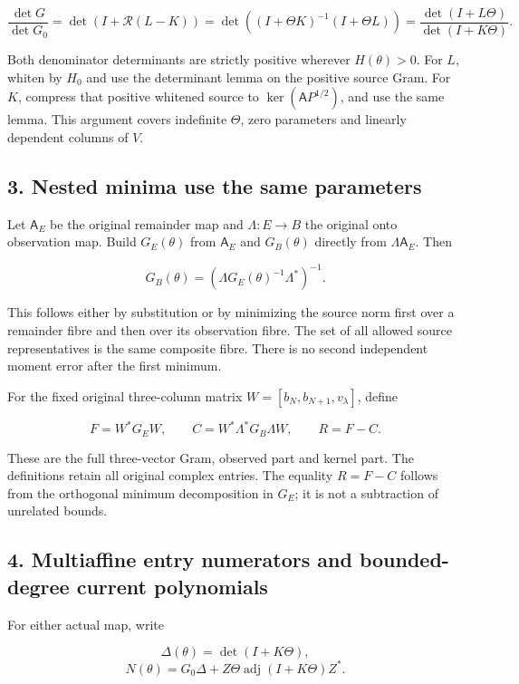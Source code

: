 \[
 \frac{\det G}{\det G_0}
 =\det\!\left(I+\mathcal R(L-K)\right)
 =\det\!\left((I+\Theta K)^{-1}(I+\Theta L)\right)
 =\frac{\det(I+L\Theta)}{\det(I+K\Theta)}.
\]

Both denominator determinants are strictly positive wherever
\(H(\theta)>0\). For \(L\), whiten by \(H_0\) and use the determinant
lemma on the positive source Gram. For \(K\), compress that positive
whitened source to \(\ker(\mathsf A P^{1/2})\), and use the same lemma.
This argument covers indefinite \(\Theta\), zero parameters and linearly
dependent columns of \(V\).

\subsection{3. Nested minima use the same
parameters}\label{nested-minima-use-the-same-parameters}

Let \(\mathsf A_E\) be the original remainder map and \(\Lambda:E\to B\)
the original onto observation map. Build \(G_E(\theta)\) from
\(\mathsf A_E\) and \(G_B(\theta)\) directly from
\(\Lambda\mathsf A_E\). Then

\[
 G_B(\theta)=(\Lambda G_E(\theta)^{-1}\Lambda^*)^{-1}.
\]

This follows either by substitution or by minimizing the source norm
first over a remainder fibre and then over its observation fibre. The
set of all allowed source representatives is the same composite fibre.
There is no second independent moment error after the first minimum.

For the fixed original three-column matrix
\(W=[b_N,b_{N+1},v_\lambda]\), define

\[
 F=W^*G_EW,\qquad
 C=W^*\Lambda^*G_B\Lambda W,\qquad R=F-C.
\]

These are the full three-vector Gram, observed part and kernel part. The
definitions retain all original complex entries. The equality \(R=F-C\)
follows from the orthogonal minimum decomposition in \(G_E\); it is not
a subtraction of unrelated bounds.

\subsection{4. Multiaffine entry numerators and bounded-degree current
polynomials}\label{multiaffine-entry-numerators-and-bounded-degree-current-polynomials}

For either actual map, write

\[
 \Delta(\theta)=\det(I+K\Theta),
\] \[
 N(\theta)=G_0\Delta+Z\Theta\operatorname{adj}(I+K\Theta)Z^*.
\]


